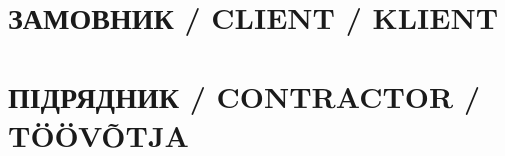 \begin{paracol}{2}
  \section*{ЗАМОВНИК / CLIENT / KLIENT}
  \switchcolumn
  \section*{ПІДРЯДНИК / CONTRACTOR / TÖÖVÕTJA}
  \switchcolumn*
  \switchcolumn
\end{paracol}
